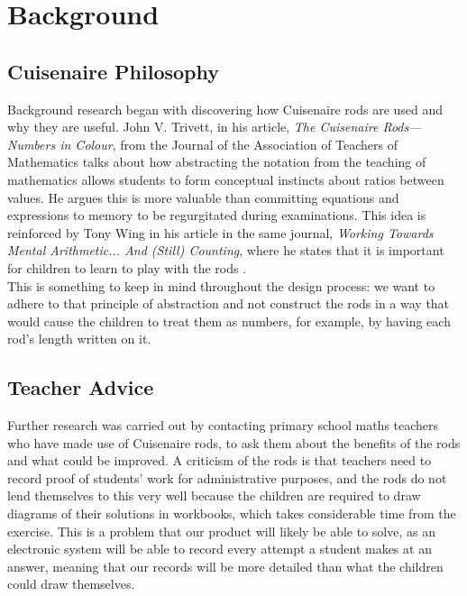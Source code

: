 \chapter{Background}


\section{Cuisenaire\textsuperscript{\textregistered} Philosophy}
Background research began with discovering how Cuisenaire\textsuperscript{\textregistered} rods are used and why they are useful. John V. Trivett, in his article, \emph{The Cuisenaire Rods—Numbers in Colour}, from the Journal of the Association of Teachers of Mathematics \cite{johnv.trivett1962} talks about how abstracting the notation from the teaching of mathematics allows students to form conceptual instincts about ratios between values. He argues this is more valuable than committing equations and expressions to memory to be regurgitated during examinations. This idea is reinforced by Tony Wing in his article in the same journal, \emph{Working Towards Mental Arithmetic... And (Still) Counting}\cite{tonywing1996}, where he states that it is important for children to learn to play with the rods .\\

This is something to keep in mind throughout the design process: we want to adhere to that principle of abstraction and not construct the rods in a way that would cause the children to treat them as numbers, for example, by having each rod's length written on it. \\

\section{Teacher Advice}

Further research was carried out by contacting primary school maths teachers who have made use of Cuisenaire\textsuperscript{\textregistered} rods, to ask them about the benefits of the rods and what could be improved. A criticism of the rods is that teachers need to record proof of students' work for administrative purposes, and the rods do not lend themselves to this very well because the children are required to draw diagrams of their solutions in workbooks, which takes considerable time from the exercise. This is a problem that our product will likely be able to solve, as an electronic system will be able to record every attempt a student makes at an answer, meaning that our records will be more detailed than what the children could draw themselves.\\

